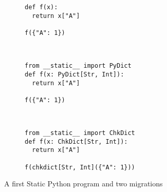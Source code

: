\documentclass[english,cleveref,submission]{programming}
\newcommand{\SP}{Static Python}
\begin{document}
\begin{figure}
  \begin{subfigure}[t]{0.22\columnwidth}\begin{spcodebox}\noindent\begin{verbatim}
def f(x):
  return x["A"]

f({"A": 1})
  \end{verbatim}
  \end{spcodebox}
  \end{subfigure}~\begin{subfigure}[t]{0.36\columnwidth}\begin{spcodebox}\noindent\begin{verbatim}
from __static__ import PyDict
def f(x: PyDict[Str, Int]):
  return x["A"]

f({"A": 1})
  \end{verbatim}
  \end{spcodebox}
  \end{subfigure}~\begin{subfigure}[t]{0.36\columnwidth}\begin{spcodebox}\noindent\begin{verbatim}
from __static__ import ChkDict
def f(x: ChkDict[Str, Int]):
  return x["A"]

f(chkdict[Str, Int]({"A": 1}))
  \end{verbatim}
  \end{spcodebox}
  \end{subfigure}

%
%
%
%
  \caption{A first \SP{} program and two migrations}
  \label{fig:sp-example}
\end{figure}
\end{document}

